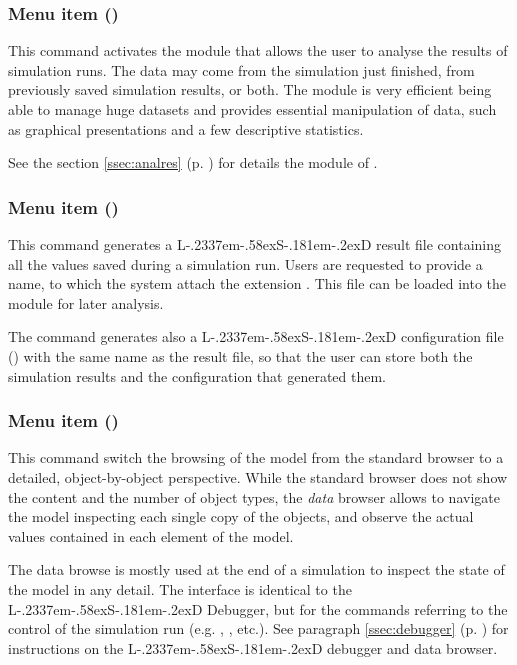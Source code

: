 \documentclass [11pt,a4paper] {book}
\def\LsD{{L\kern-.2337em\lower-.58ex\hbox{S}\kern-.181em\lower-.2ex\hbox{D}}\xspace}
\begin{document}
\subsubsection{Menu item  ()}

This command activates the module  that allows the user to analyse the results of simulation runs. The data may come from the simulation just finished, from previously saved simulation results, or both. The module is very efficient being able to manage huge datasets and provides essential manipulation of data, such as graphical presentations and a few descriptive statistics. 

See the section \ref{ssec:analres} (p. \pageref{ssec:analres}) for details the module of  .

\subsubsection{Menu item  ()}

This command generates a \LsD result file containing all the values saved during a simulation run. Users are requested to provide a name, to which the system attach the extension . This file can be loaded into the module  for later analysis.

The command generates also a \LsD configuration file () with the same name as the result file, so that the user can store both the simulation results and the configuration that generated them.

\subsubsection{Menu item  ()} 

This command switch the browsing of the model from the standard browser to a detailed, object-by-object perspective. While the standard browser does not show the content and the number of object types, the \textit{data} browser allows to navigate the model inspecting each single copy of the objects, and observe the actual values contained in each element of the model.

The data browse is mostly used at the end of a simulation to inspect the state of the model in any detail. The interface is identical to the \LsD Debugger, but for the commands referring to the control of the simulation run (e.g. , , etc.). See paragraph \ref{ssec:debugger} (p. \pageref{ssec:debugger})  for instructions on the \LsD debugger and data browser.
\end{document}
